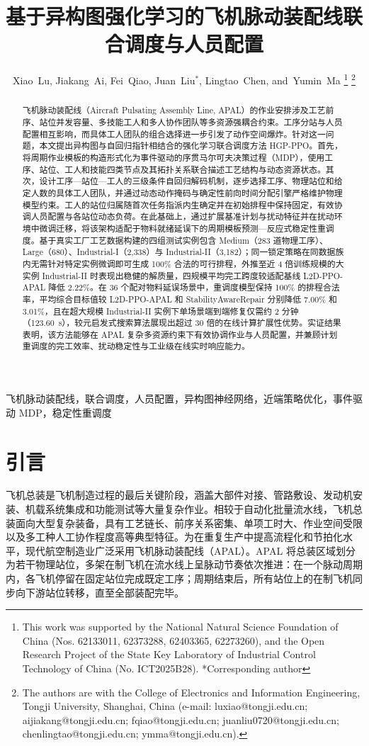 \documentclass[journal,10pt]{IEEEtran}
\title{基于异构图强化学习的飞机脉动装配线联合调度与人员配置}
\author{Xiao~Lu,
        Jiakang~Ai,
        Fei~Qiao,
        Juan~Liu$^*$,
        Lingtao~Chen,
        and~Yumin~Ma%
\thanks{This work was supported by the National Natural Science Foundation of China (Nos. 62133011, 62373288, 62403365, 62273260), and the Open Research Project of the State Key Laboratory of Industrial Control Technology of China (No. ICT2025B28). *Corresponding author}%
\thanks{The authors are with the College of Electronics and Information Engineering, Tongji University, Shanghai, China (e-mail: luxiao@tongji.edu.cn; aijiakang@tongji.edu.cn; fqiao@tongji.edu.cn; juanliu0720@tongji.edu.cn; chenlingtao@tongji.edu.cn; ymma@tongji.edu.cn).}%
}
\begin{document}
\maketitle

\begin{abstract}
飞机脉动装配线（Aircraft Pulsating Assembly Line, APAL）的作业安排涉及工艺前序、站位并发容量、多技能工人和多人协作团队等多资源强耦合约束。工序分站与人员配置相互影响，而具体工人团队的组合选择进一步引发了动作空间爆炸。针对这一问题，本文提出异构图与自回归指针相结合的强化学习联合调度方法 HGP-PPO。首先，将周期作业模板的构造形式化为事件驱动的序贯马尔可夫决策过程（MDP），使用工序、站位、工人和技能四类节点及其拓扑关系联合描述工艺结构与动态资源状态。其次，设计工序---站位---工人的三级条件自回归解码机制，逐步选择工序、物理站位和给定人数的具体工人团队，并通过动态动作掩码与确定性前向时间分配引擎严格维护物理模型约束。工人的站位归属随首次任务指派内生确定并在初始排程中保持固定，有效协调人员配置与各站位动态负荷。在此基础上，通过扩展基准计划与扰动特征并在扰动环境中微调迁移，将该架构适配于物料就绪延误下的周期模板预测---反应式稳定性重调度。基于真实工厂工艺数据构建的四组测试实例包含 Medium（283 道物理工序）、Large（680）、Industrial-I（2,338）与 Industrial-II（3,182）；同一锁定策略在同数据族内无需针对特定实例微调即可生成 100\% 合法的可行排程，外推至近 4 倍训练规模的大实例 Industrial-II 时表现出稳健的解质量，四规模平均完工跨度较适配基线 L2D-PPO-APAL 降低 2.22\%。在 36 个配对物料延误场景中，重调度模型保持 100\% 的排程合法率，平均综合目标值较 L2D-PPO-APAL 和 StabilityAwareRepair 分别降低 7.00\% 和 3.01\%，且在超大规模 Industrial-II 实例下单场景端到端修复仅需约 2 分钟（123.60~s），较元启发式搜索算法展现出超过 30 倍的在线计算扩展性优势。实证结果表明，该方法能够在 APAL 复杂多资源约束下有效协调作业与人员配置，并兼顾计划重调度的完工效率、扰动稳定性与工业级在线实时响应能力。
\end{abstract}

\begin{IEEEkeywords}
飞机脉动装配线，联合调度，人员配置，异构图神经网络，近端策略优化，事件驱动 MDP，稳定性重调度
\end{IEEEkeywords}

\section{引言}\label{sec:introduction}

飞机总装是飞机制造过程的最后关键阶段，涵盖大部件对接、管路敷设、发动机安装、机载系统集成和功能测试等大量复杂作业。相较于自动化批量流水线，飞机总装面向大型复杂装备，具有工艺链长、前序关系密集、单项工时大、作业空间受限以及多工种人工协作程度高等典型特征\cite{fang2021, bao2023, wang2024}。为在重复生产中提高流程化和节拍化水平，现代航空制造业广泛采用飞机脉动装配线（APAL）。APAL 将总装区域划分为若干物理站位，多架在制飞机在流水线上呈脉动节奏依次推进：在一个脉动周期内，各飞机停留在固定站位完成既定工序；周期结束后，所有站位上的在制飞机同步向下游站位转移，直至全部装配完毕\cite{lu2019}。
\end{document}
